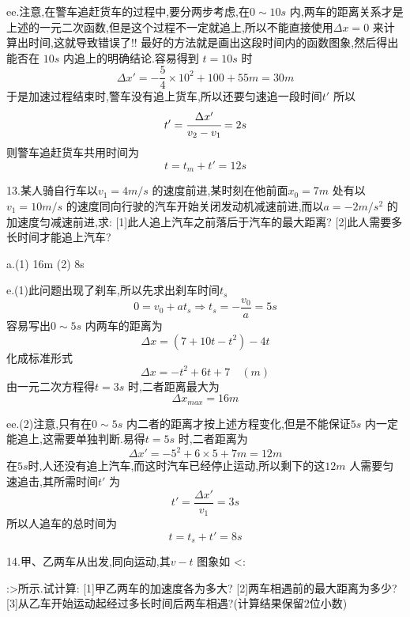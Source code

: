 \begin{calculate}
ee.注意,在警车追赶货车的过程中,要分两步考虑,在$0\sim 10s$ 内,两车的距离关系才是上述的一元二次函数,但是这个过程不一定就追上,所以不能直接使用$\Delta x=0$ 来计算出时间,这就导致错误了!! 最好的方法就是画出这段时间内的函数图象,然后得出能否在 $10s$ 内追上的明确结论.容易得到 $t=10s$ 时
$$\Delta x'=-\frac{5}{4}\times 10^2 +100 +55m =30m$$
于是加速过程结束时,警车没有追上货车,所以还要匀速追一段时间$t'$ 所以
$$t'=\cfrac{\Delta x'}{v_2-v_1}=2s$$
则警车追赶货车共用时间为
$$t=t_m+t'=12s$$

13.某人骑自行车以$v_1=4m/s$ 的速度前进,某时刻在他前面$x_0=7m$ 处有以$v_1=10m/s$ 的速度同向行驶的汽车开始关闭发动机减速前进,而以$a=-2m/s^2$ 的加速度匀减速前进,求:
[1]此人追上汽车之前落后于汽车的最大距离?
[2]此人需要多长时间才能追上汽车?

a.(1) 16m \qquad (2) 8s

e.(1)此问题出现了刹车,所以先求出刹车时间$t_s$
$$0=v_0+at_s \Longrightarrow t_s=-\frac{v_0}{a}=5s$$
容易写出$0\sim 5s$ 内两车的距离为
$$\Delta x = (7+10t-t^2)-4t $$
化成标准形式
$$\Delta x=-t^2+6t+7 \quad (m)$$
由一元二次方程得$t=3s$ 时,二者距离最大为
$$\Delta x_{max}=16m$$

ee.(2)注意,只有在$0\sim 5s$ 内二者的距离才按上述方程变化,但是不能保证$5s$ 内一定能追上,这需要单独判断.易得$t=5s$ 时,二者距离为
$$\Delta x'=-5^2+6\times 5 +7 m =12m$$
在$5s$时,人还没有追上汽车,而这时汽车已经停止运动,所以剩下的这$12m$ 人需要匀速追击,其所需时间$t'$ 为
$$t'=\frac{\Delta x'}{v_1}=3s$$
所以人追车的总时间为
$$t=t_s+t'=8s$$


14.甲、乙两车从出发,同向运动,其$v-t$ 图象如
<:
:>所示.试计算:
[1]甲乙两车的加速度各为多大?
[2]两车相遇前的最大距离为多少?
[3]从乙车开始运动起经过多长时间后两车相遇?(计算结果保留$2$位小数)


\end{calculate}
